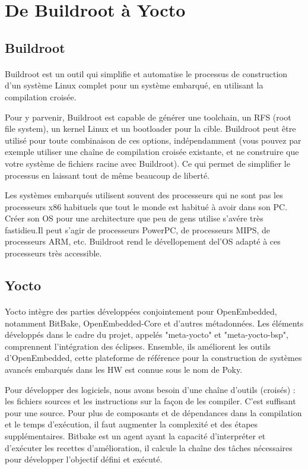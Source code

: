 \section{De Buildroot à Yocto}

\subsection{Buildroot}
\paragraph{}
Buildroot est un outil qui simplifie et automatise le processus de construction d'un système Linux complet pour un système embarqué, 
en utilisant la compilation croisée.

Pour y parvenir, Buildroot est capable de générer une toolchain, un RFS (root file system),
 un kernel Linux et un bootloader pour la cible. Buildroot peut être utilisé pour toute combinaison de ces options, 
 indépendamment (vous pouvez par exemple utiliser une chaîne de compilation croisée existante, 
 et ne construire que votre système de fichiers racine avec Buildroot). Ce qui permet de simplifier le processus en laissant tout de même beaucoup de liberté.

Les systèmes embarqués utilisent souvent des processeurs qui ne sont pas les processeurs x86 habituels que tout le monde est habitué à avoir dans son PC.
Créer son OS pour une architecture que peu de gens utilise s'avére très fastidieu.Il peut s'agir de processeurs PowerPC, de processeurs MIPS, de processeurs ARM, etc.
Buildroot rend le dévellopement del'OS adapté à ces processeurs très accessible.

\subsection{Yocto}
\paragraph{}
Yocto intègre des parties développées conjointement pour OpenEmbedded, notamment BitBake, OpenEmbedded-Core et d'autres métadonnées. 
Les éléments développés dans le cadre du projet, appelés "meta-yocto" et "meta-yocto-bsp", comprennent l'intégration des éclipses. 
Ensemble, ils améliorent les outils d'OpenEmbedded, cette plateforme de référence pour la construction de systèmes avancés embarqués dans les HW est connue 
sous le nom de Poky.

Pour développer des logiciels, nous avons besoin d'une chaîne d'outils (croisés) : les fichiers sources et les instructions sur la façon de les compiler. 
C'est suffisant pour une source. 
Pour plus de composants et de dépendances dans la compilation et le temps d'exécution, il faut augmenter la complexité et des étapes supplémentaires. 
Bitbake est un agent ayant la capacité d'interpréter et d'exécuter les recettes d'amélioration, il calcule la chaîne des tâches nécessaires pour développer l'objectif défini et exécuté. 


